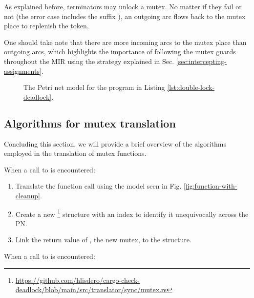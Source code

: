 As explained before,  terminators may unlock a mutex.
No matter if they fail or not (the error case includes the suffix ),
an outgoing arc flows back to the mutex place to replenish the token.

One should take note that there are more incoming arcs to the mutex place than outgoing arcs,
which highlights the importance of following the mutex guards throughout the \acrshort{MIR}
using the strategy explained in Sec. \ref{sec:intercepting-assignments}.

\begin{figure}[!htbp]
      \centering
      
      \caption{The Petri net model for the program in Listing \ref{lst:double-lock-deadlock}.}
      \label{fig:mutex-example}
\end{figure}

\subsection{Algorithms for mutex translation}
\label{sec:mutex-algorithms}

Concluding this section, we will provide a brief overview of the algorithms
employed in the translation of mutex functions.

When a call to  is encountered:

\begin{enumerate}
      \item Translate the function call using the model seen in Fig. \ref{fig:function-with-cleanup}.
      \item Create a new \footnote{\url{https://github.com/hlisdero/cargo-check-deadlock/blob/main/src/translator/sync/mutex.rs}}
            structure with an index to identify it unequivocally across the \acrshort{PN}.
      \item Link the return value of ,
            the new mutex, to the  structure.
\end{enumerate}

When a call to  is encountered:


